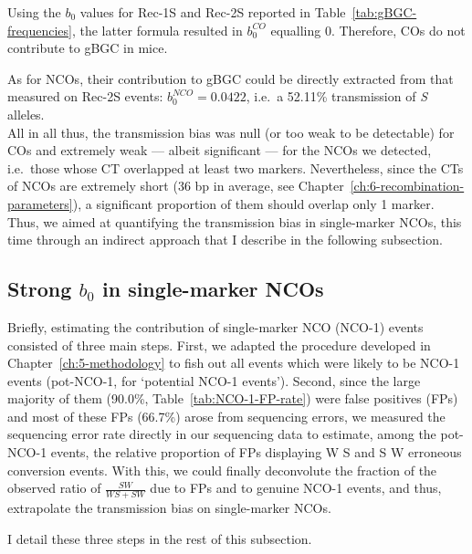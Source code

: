 Using the $b_0$ values for Rec-1S and Rec-2S reported in Table~\ref{tab:gBGC-frequencies}, the latter formula resulted in $b_0^{CO}$ equalling 0. 
Therefore, COs do not contribute to gBGC in mice.

As for NCOs, their contribution to gBGC could be directly extracted from that measured on Rec-2S events: $b_0^{NCO} = 0.0422$, i.e.\ a 52.11\% transmission of \textit{S} alleles.\\

All in all thus, the transmission bias was null (or too weak to be detectable) for COs and extremely weak — albeit significant — for the NCOs we detected, i.e.\ those whose CT overlapped at least two markers.
Nevertheless, since the CTs of NCOs are extremely short (36 bp in average, see Chapter~\ref{ch:6-recombination-parameters}), a significant proportion of them should overlap only 1 marker.
Thus, we aimed at quantifying the transmission bias in single-marker NCOs, this time through an indirect approach that I describe in the following subsection.

\subsection{Strong $b_0$ in single-marker NCOs}

Briefly, estimating the contribution of single-marker NCO (NCO-1) events consisted of three main steps.
First, we adapted the procedure developed in Chapter~\ref{ch:5-methodology} to fish out all events which were likely to be NCO-1 events (pot-NCO-1, for ‘potential NCO-1 events’).
Second, since the large majority of them (90.0\%, Table~\ref{tab:NCO-1-FP-rate}) were false positives (FPs) and most of these FPs (66.7\%) arose from sequencing errors, we measured the sequencing error rate directly in our sequencing data to estimate, among the pot-NCO-1 events, the relative proportion of FPs displaying W\textrightarrow{} S and S\textrightarrow{} W erroneous conversion events.
With this, we could finally deconvolute the fraction of the observed ratio of $\frac{SW}{WS+SW}$ due to FPs and to genuine NCO-1 events, and thus, extrapolate the transmission bias on single-marker NCOs.

I detail these three steps in the rest of this subsection.




